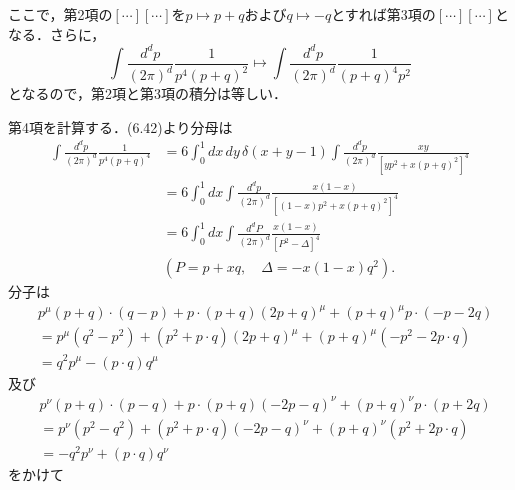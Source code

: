 ここで，第2項の$[\cdots][\cdots]$を$p \mapsto p+q$および$q \mapsto -q$とすれば第3項の$[\cdots][\cdots]$となる．さらに，
\[
\int \frac{d^dp}{(2\pi)^d} \frac{1}{p^4(p+q)^2} \mapsto \int \frac{d^dp}{(2\pi)^d} \frac{1}{(p+q)^4p^2}
\]
となるので，第2項と第3項の積分は等しい．

第4項を計算する．(6.42)より分母は
\begin{align*}
  \int \frac{d^dp}{(2\pi)^d} \frac{1}{p^4(p+q)^4}
  &= 6 \int_0^1 dx\,dy\, \delta(x+y-1) \int \frac{d^dp}{(2\pi)^d} \frac{xy}{[yp^2+x(p+q)^2]^4} \\
  &= 6 \int_0^1 dx \int \frac{d^dp}{(2\pi)^d} \frac{x(1-x)}{[(1-x)p^2+x(p+q)^2]^4} \\
  &= 6 \int_0^1 dx \int \frac{d^dP}{(2\pi)^d} \frac{x(1-x)}{[P^2 - \Delta]^4} \\
  & ( P = p + xq , \quad \Delta = - x(1-x) q^2 ) .
\end{align*}
分子は
\begin{align*}
  & p^\mu (p+q) \cdot (q-p) + p \cdot (p+q) (2p+q)^\mu + (p+q)^\mu p \cdot (-p-2q) \\
  & = p^\mu (q^2 - p^2) + (p^2 + p \cdot q) (2p+q)^\mu + (p+q)^\mu (-p^2 - 2p \cdot q) \\
  &= q^2 p^\mu - (p\cdot q) q^\mu
\end{align*}
及び
\begin{align*}
  & p^\nu (p+q) \cdot (p-q) + p \cdot (p+q) (-2p-q)^\nu + (p+q)^\nu p \cdot (p+2q) \\
  &= p^\nu (p^2 - q^2) + (p^2 + p \cdot q) (-2p-q)^\nu + (p+q)^\nu (p^2 + 2 p \cdot q) \\
  &= -q^2 p^\nu + (p\cdot q) q^\nu
\end{align*}
をかけて
